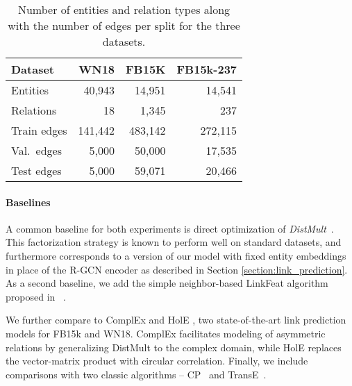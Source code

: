 \documentclass[letterpaper]{article} \usepackage{aaai18}  \usepackage{times}  \usepackage{helvet}  \usepackage{courier}  \usepackage{url}  \usepackage{graphicx}  \frenchspacing
\newcommand{\citet}[1]{\citeauthor{#1}~\shortcite{#1}}
\begin{document}
\begin{table}[ht]
\centering
\begin{tabular}{lrrr}
\toprule
Dataset & WN18 & FB15K & FB15k-237\\ \midrule
Entities    & 40,943  & 14,951 & 14,541\\
Relations   & 18 & 1,345 & 237\\
Train edges & 141,442 & 483,142 & 272,115\\
Val.~edges & 5,000 & 50,000 & 17,535\\
Test edges & 5,000 & 59,071 & 20,466\\ \bottomrule
\end{tabular}
\caption{Number of entities and relation types along with the number of edges per split for the three datasets.\label{table:datasets}}
\end{table}

\paragraph{Baselines}
A common baseline for both experiments is direct optimization of \textit{DistMult}~\cite{distmult-embedding_entities_and_relations}. This factorization strategy is known to perform well on standard datasets, and furthermore corresponds to a version of our model with fixed entity embeddings in place of the R-GCN encoder as described in Section \ref{section:link_prediction}. As a second baseline, we add the simple neighbor-based LinkFeat algorithm proposed in \citet{toutanova2015observed}.

We further compare to ComplEx \cite{complex-complex_embeddings_for_simple_link_prediction} and HolE \cite{nickel2015holographic}, two state-of-the-art link prediction models for FB15k and WN18. ComplEx facilitates modeling of asymmetric relations by generalizing DistMult to the complex domain, while HolE replaces the vector-matrix product with circular correlation. Finally, we include comparisons with two classic algorithms -- CP~\cite{hitchcock1927expression} and TransE~\cite{bordes2013translating}.
\end{document}
